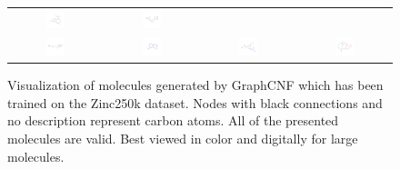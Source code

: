 \begin{figure}[t]
\begin{tabular}{cccc}
        \includegraphics[width=0.22\textwidth]{figures/experiments_figures/molecule_samples/generated_molecule_16_v.pdf} &
        \includegraphics[width=0.22\textwidth]{figures/experiments_figures/molecule_samples/generated_molecule_19_v.pdf} \\
        \includegraphics[width=0.22\textwidth]{figures/experiments_figures/molecule_samples/generated_molecule_120_v.pdf} & 
        \includegraphics[width=0.22\textwidth]{figures/experiments_figures/molecule_samples/generated_molecule_22_v.pdf} &
        \includegraphics[width=0.22\textwidth]{figures/experiments_figures/molecule_samples/generated_molecule_23_v.pdf} &
        \includegraphics[width=0.22\textwidth]{figures/experiments_figures/molecule_samples/generated_molecule_269_v.pdf}
        \\
    \end{tabular}
    \caption[Samples of molecule graphs from GraphCNF]{Visualization of molecules generated by GraphCNF which has been trained on the Zinc250k \cite{Zinc250k} dataset. Nodes with black connections and no description represent carbon atoms. All of the presented molecules are valid. Best viewed in color and digitally for large molecules.}
    \label{fig:appendix_molecule_generation}
\end{figure}

